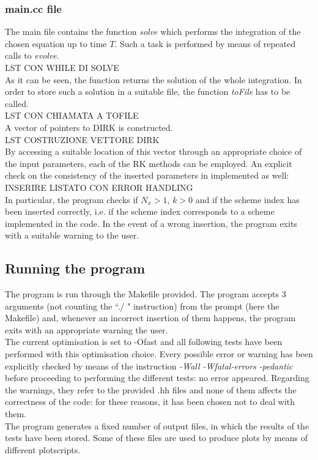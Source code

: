 \documentclass[11pt]{article}
\theoremstyle{theorem}
\theoremstyle{definition}
\begin{document}
\subsubsection{main.cc file}
The main file contains the function \emph{solve} which performs the integration of the chosen equation up to time $T$. Such a task is performed by means of repeated calls to \emph{evolve}.\\

LST CON WHILE DI SOLVE\\

As it can be seen, the function returns the solution of the whole integration. In order to store such a solution in a suitable file, the function \emph{toFile} has to be called.\\

LST CON CHIAMATA A TOFILE\\

A vector of pointers to DIRK is constructed.\\

LST COSTRUZIONE VETTORE DIRK\\

By accessing a suitable location of this vector through an appropriate choice of the input parameters, each of the RK methods can be employed. An explicit check on the consistency of the inserted parameters in implemented as well:\\

INSERIRE LISTATO CON ERROR HANDLING\\

In particular, the program checks if $N_x>1$, $k>0$ and if the scheme index has been inserted correctly, i.e. if the scheme index corresponds to a scheme implemented in the code. In the event of a wrong insertion, the program exits with a suitable warning to the user.\\

\subsection{Running the program}
The program is run through the Makefile provided.
The program accepts 3 arguments (not counting the ``./ " instruction) from the prompt (here the Makefile) and, whenever an incorrect insertion of them happens, the program exits with an appropriate warning the user.\\
The current optimisation is set to -Ofast and all following tests have been performed with this optimisation choice. Every possible error or warning has been explicitly checked by means of the instruction \emph{-Wall -Wfatal-errors -pedantic} before proceeding to performing the different tests: no error appeared. Regarding the warnings, they refer to the provided .hh files and none of them affects the correctness of the code: for these reasons, it has been chosen not to deal with them.\\
The program generates a fixed number of output files, in which the results of the tests have been stored. Some of these files are used to produce plots by means of different plotscripts.\\
\end{document}
